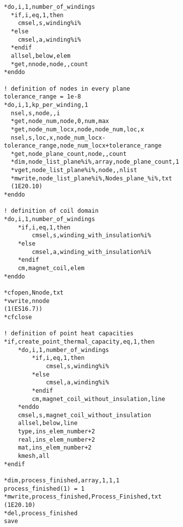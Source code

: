 \begin{verbatim}
*do,i,1,number_of_windings
  *if,i,eq,1,then
    cmsel,s,winding%i%
  *else
    cmsel,a,winding%i%
  *endif
  allsel,below,elem
  *get,nnode,node,,count
*enddo

! definition of nodes in every plane
tolerance_range = 1e-8
*do,i,1,kp_per_winding,1
  nsel,s,node,,i
  *get,node_num,node,0,num,max
  *get,node_num_locx,node,node_num,loc,x
  nsel,s,loc,x,node_num_locx-tolerance_range,node_num_locx+tolerance_range
  *get,node_plane_count,node,,count
  *dim,node_list_plane%i%,array,node_plane_count,1
  *vget,node_list_plane%i%,node,,nlist
  *mwrite,node_list_plane%i%,Nodes_plane_%i%,txt
  (1E20.10)
*enddo

! definition of coil domain 
*do,i,1,number_of_windings
	*if,i,eq,1,then
	    cmsel,s,winding_with_insulation%i%
	*else
		cmsel,a,winding_with_insulation%i%
	*endif
	cm,magnet_coil,elem
*enddo

*cfopen,Nnode,txt
*vwrite,nnode
(1(ES16.7))
*cfclose

! definition of point heat capacities
*if,create_point_thermal_capacity,eq,1,then
    *do,i,1,number_of_windings
        *if,i,eq,1,then
            cmsel,s,winding%i%
        *else
            cmsel,a,winding%i%
        *endif
        cm,magnet_coil_without_insulation,line
    *enddo
    cmsel,s,magnet_coil_without_insulation
    allsel,below,line
    type,ins_elem_number+2
    real,ins_elem_number+2
    mat,ins_elem_number+2
    kmesh,all
*endif

*dim,process_finished,array,1,1,1
process_finished(1) = 1
*mwrite,process_finished,Process_Finished,txt
(1E20.10)
*del,process_finished
save
\end{verbatim}